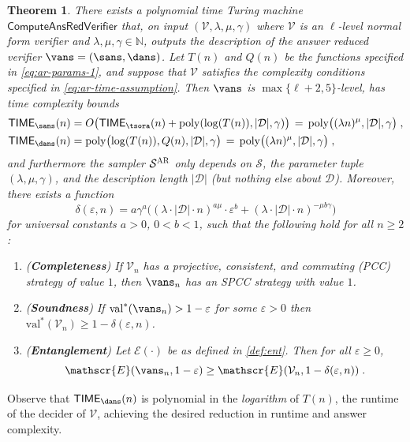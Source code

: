 \documentclass[11pt]{article}
\newtheorem{theorem}{Theorem}[section]
\theoremstyle{definition}
\newcommand{\N}{\ensuremath{\mathbb{N}}}
\DeclareMathOperator{\poly}{poly}
\newcommand{\val}{\ensuremath{\mathrm{val}}}
\newcommand{\eps}{\varepsilon}
\newcommand{\sampler}{\mathcal{S}}
\newcommand{\decider}{\mathcal{D}}
\newcommand{\verifier}{\mathcal{V}}
\newcommand{\gamestyle}[1]{\ensuremath{\textsc{#1}}\xspace}
\newcommand{\ar}{\gamestyle{AR}}
\newcommand{\Ent}{\mathscr{E}}
\newcommand{\TIME}{\mathsf{TIME}}
\newcommand{\tmstyle}[1]{\ensuremath{\mathsf{#1}}}
\newcommand{\ComputeAnsVerifier}{\tmstyle{ComputeAnsRedVerifier}}
\begin{document}
\begin{theorem}\label{thm:ar}
  There exists a polynomial time Turing machine $\ComputeAnsVerifier$ that, on
  input $(\verifier, \lambda, \mu, \gamma)$ where $\verifier$ is an $\ell$-level
  normal form verifier and $\lambda, \mu, \gamma \in \N$, outputs the
  description of the answer reduced verifier $\vans = (\sans, \dans)$.
  Let $T(n)$ and $Q(n)$ be the functions specified in \cref{eq:ar-params-1}, and
  suppose that $\verifier$ satisfies the complexity conditions specified in
  \cref{eq:ar-time-assumption}.
  Then $\vans$ is $\max\{\ell+2, 5\}$-level, has time complexity bounds
  \begin{align*}
    \TIME_{\sans}(n)
    & = O \bigl( \TIME_{\tsora}(n) + \poly(\log(T(n)),|\decider|,\gamma) \bigr) 
     \,=\, \poly\bigl( (\lambda n)^\mu, |\decider|,\gamma \bigr)\;,\\
    \TIME_{\dans}(n)
    & = \poly \bigl( \log(T(n)),Q(n),|\decider|,\gamma \bigr) \,=\,
      \poly\bigl( (\lambda n)^\mu, |\decider|,\gamma \bigr)\;,
  \end{align*}
  and furthermore the sampler $\sampler^\ar$ only depends on
  $\sampler$, the parameter tuple $(\lambda, \mu, \gamma)$, and the description
  length $|\decider|$ (but nothing else about $\decider$).
	Moreover, there exists a function
  \begin{equation*}
    \delta(\eps, n) = a \gamma^a \bigl( (\lambda \cdot |\decider| \cdot n)^{a \mu}
    \cdot \eps^b + (\lambda \cdot |\decider| \cdot n)^{-\mu b\gamma} \bigr)
  \end{equation*}
  for universal constants $a>0$, $0<b<1$, such that the following hold for all $n \geq 2$:
  \begin{enumerate}
  \item (\textbf{Completeness}) If $\verifier_n$ has a projective, consistent,
    and commuting (PCC) strategy of value $1$, then $\vans_n$
    has an SPCC strategy with value $1$.
    \label{enu:ar-completeness}
	\item (\textbf{Soundness}) If $\val^*(\vans_n) > 1 - \eps$ for some $\eps > 0$
    then $\val^*(\verifier_n) \geq 1 - \delta(\eps, n)$.\label{enu:ar-soundness}
  \item (\textbf{Entanglement}) Let $\Ent(\cdot)$ be as defined in \cref{def:ent}.
    Then for all $\eps\geq 0$,
    \begin{equation*}
      \Ent(\vans_n, 1 - \eps) \geq \Ent(\verifier_{n}, 1 - \delta(\eps, n))\;.
    \end{equation*}
  \end{enumerate}
\end{theorem}
Observe that $\TIME_{\dans}(n)$ is polynomial in the \emph{logarithm}
of $T(n)$, the runtime of the decider of $\verifier$, achieving the
desired reduction in runtime and answer complexity.
\end{document}
